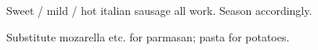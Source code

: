 \begin{variation}
\item Sweet / mild / hot italian sausage all work. Season accordingly.

\item Substitute mozarella etc. for parmasan; pasta for potatoes.
\end{variation}


\recipeend
